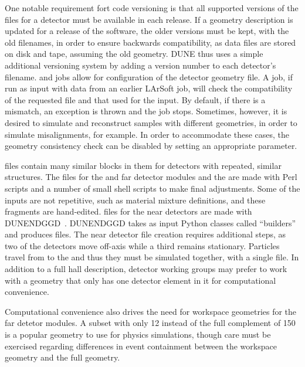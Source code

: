 \documentclass[../main-v1.tex]{subfiles}
\begin{document}
One notable 
requirement %
fort code versioning is that all supported versions of the  files for a detector must be available in each release.  If a geometry description is updated for a release of the software, the older versions must be kept, with the old  filenames, in order to ensure backwards compatibility, as data files are stored on disk and tape, assuming the old geometry.  DUNE thus uses a simple additional versioning system by adding a version number to each detector's  filename.   and   jobs allow for  configuration of the detector geometry  file.  A   job, if run as input with data from an earlier LArSoft job, will check the compatibility of the requested  file and that used for the input.  By default, if there is a mismatch, an exception is thrown and the job stops.  Sometimes, however, it is desired to simulate and reconstruct  samples with different geometries, in order to simulate misalignments, for example.  In order to accommodate these cases, the geometry consistency check can be disabled by setting an appropriate  parameter.

  files contain many similar blocks in them for detectors with repeated, similar structures.  The   files for the %
 and  far detector modules and the  are made with Perl scripts and a number of small shell scripts to make final adjustments.  Some of the inputs are not repetitive, such as material mixture definitions, and these fragments are hand-edited.    files for the near detectors are made with DUNENDGGD~\cite{ref:ggd}.  DUNENDGGD takes as input Python classes called ``builders'' 
and produces   files.  The near detector   file creation requires additional steps, as two of the detectors move off-axis while a third remains stationary.  Particles travel from  to the  and thus they must be simulated together, with a single   file.  In addition to a full hall description, detector working groups may prefer to work with a geometry that only has one detector element in it for computational convenience.

Computational convenience also drives the need for workspace geometries for the far detetor modules.  A subset with only 12  instead of the full complement of 150 is a popular geometry to use for physics simulations, though care must be exercised regarding differences in event containment between the workspace geometry and the full geometry.
\end{document}
